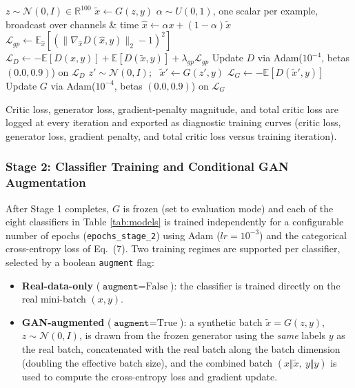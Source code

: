 \documentclass[12pt]{article}
\begin{document}
\begin{algorithm}[H]
\caption{Stage 1 -- Conditional WGAN-GP training (one epoch)}
\label{alg:wgan}
\begin{algorithmic}[1]
    \State $z \sim \mathcal{N}(0, I) \in \mathbb{R}^{100}$
    \State $\tilde{x} \gets G(z, y)$ 
    \State $\alpha \sim U(0,1)$, one scalar per example, broadcast over channels \& time
    \State $\hat{x} \gets \alpha x + (1-\alpha)\tilde{x}$
    \State $\mathcal{L}_{gp} \gets \mathbb{E}_{\hat{x}}\left[(\lVert \nabla_{\hat{x}} D(\hat{x}, y)\rVert_2 - 1)^2\right]$ 
    \State $\mathcal{L}_D \gets -\mathbb{E}[D(x,y)] + \mathbb{E}[D(\tilde{x},y)] + \lambda_{gp}\mathcal{L}_{gp}$ 
    \State Update $D$ via Adam($10^{-4}$, betas $(0.0,0.9)$) on $\mathcal{L}_D$
        \State $z' \sim \mathcal{N}(0, I)$; \ $\tilde{x}' \gets G(z', y)$
        \State $\mathcal{L}_G \gets -\mathbb{E}[D(\tilde{x}', y)]$ 
        \State Update $G$ via Adam($10^{-4}$, betas $(0.0,0.9)$) on $\mathcal{L}_G$
    \EndIf
\EndFor
\end{algorithmic}
\end{algorithm}

Critic loss, generator loss, gradient-penalty magnitude, and total critic loss are logged at every iteration and exported as diagnostic training curves (critic loss, generator loss, gradient penalty, and total critic loss versus training iteration).

\subsubsection*{Stage 2: Classifier Training and Conditional GAN Augmentation}
After Stage 1 completes, $G$ is frozen (set to evaluation mode) and each of the eight classifiers in Table \ref{tab:models} is trained independently for a configurable number of epochs (\texttt{epochs\_stage\_2}) using Adam ($lr=10^{-3}$) and the categorical cross-entropy loss of Eq.~(7). Two training regimes are supported per classifier, selected by a boolean \texttt{augment} flag:

\begin{itemize}
    \item \textbf{Real-data-only} ($\texttt{augment}=\text{False}$): the classifier is trained directly on the real mini-batch $(x, y)$.
    \item \textbf{GAN-augmented} ($\texttt{augment}=\text{True}$): a synthetic batch $\tilde{x} = G(z, y)$, $z\sim\mathcal{N}(0,I)$, is drawn from the frozen generator using the \emph{same} labels $y$ as the real batch, concatenated with the real batch along the batch dimension (doubling the effective batch size), and the combined batch $(x \Vert \tilde{x},\ y \Vert y)$ is used to compute the cross-entropy loss and gradient update.
\end{itemize}
\end{document}
